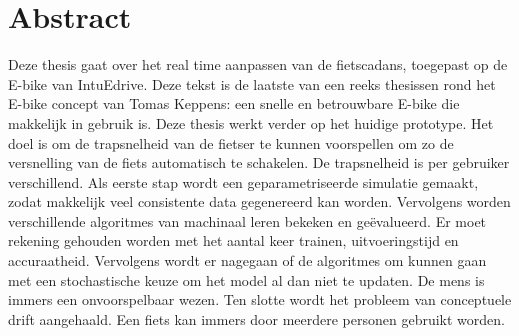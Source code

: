 \documentclass[12pt,a4paper,oneside]{book}
\makeatletter
\renewcommand{\algorithmcfname}{Algoritme}
\newcommand{\RemoveAlgoNumber}{\renewcommand{\fnum@algocf}{\AlCapSty{\AlCapFnt\algorithmcfname}}}
\makeatother
\begin{document}
\chapter{Abstract}
Deze thesis gaat over het real time aanpassen van de fietscadans, toegepast op de E-bike van IntuEdrive. Deze tekst is de laatste van een reeks thesissen rond het E-bike concept van Tomas Keppens: een snelle en betrouwbare E-bike die makkelijk in gebruik is. Deze thesis werkt verder op het huidige prototype. Het doel is om de trapsnelheid van de fietser te kunnen voorspellen om zo de versnelling van de fiets automatisch te schakelen. De trapsnelheid is per gebruiker verschillend. Als eerste stap wordt een geparametriseerde simulatie gemaakt, zodat makkelijk veel consistente data gegenereerd kan worden. Vervolgens worden verschillende algoritmes van machinaal leren bekeken en geëvalueerd. Er moet rekening gehouden worden met het aantal keer trainen, uitvoeringstijd en accuraatheid. Vervolgens wordt er nagegaan of de algoritmes om kunnen gaan met een stochastische keuze om het model al dan niet te updaten. De mens is immers een onvoorspelbaar wezen. Ten slotte wordt het probleem van conceptuele drift aangehaald. Een fiets kan immers door meerdere personen gebruikt worden.
\tableofcontents
\newpage
\listoffigures
{}
\listoftables
{}
\newpage
\printglossary[type=\acronymtype ,title=Lijst van afkortingen ,style=mystyle]
\newpage
{}
\printglossary[title=Lijst van symbolen,style=mystyle]

\mainmatter
{}
\RemoveAlgoNumber







\end{document}
